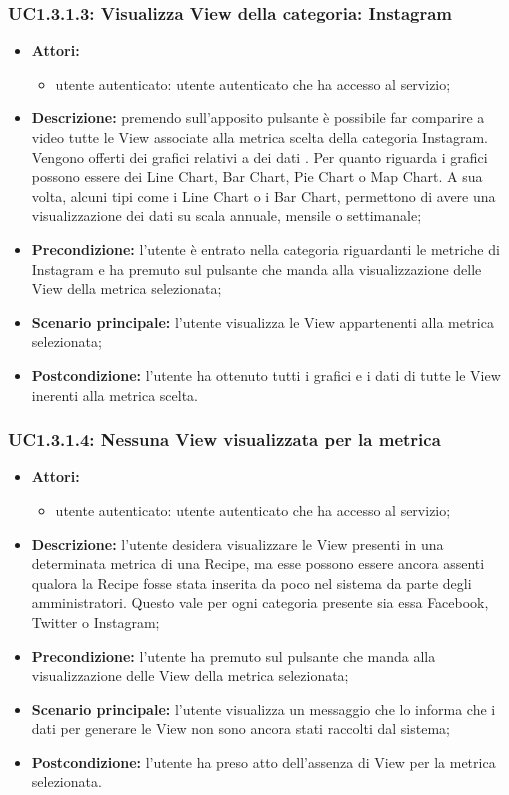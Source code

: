 \subsubsection{UC1.3.1.3: Visualizza View della categoria: Instagram}
\begin{itemize}
	\item \textbf{Attori:}
	\begin{itemize}
		\item utente autenticato: utente autenticato che ha accesso al servizio;
	\end{itemize}
	\item \textbf{Descrizione:} premendo sull'apposito pulsante è possibile far comparire a video tutte le View associate alla metrica scelta della categoria Instagram. Vengono offerti dei grafici relativi a dei dati
	. Per quanto riguarda i grafici possono essere dei Line Chart, Bar Chart, Pie Chart o Map Chart. A sua volta, alcuni tipi come i Line Chart o i Bar Chart, permettono di avere una visualizzazione dei dati su scala annuale, mensile o settimanale;
	\item \textbf{Precondizione:} l'utente è entrato nella categoria riguardanti le metriche di Instagram e ha premuto sul pulsante che manda alla visualizzazione delle View della metrica selezionata;
	\item \textbf{Scenario principale:} l'utente visualizza le View appartenenti alla metrica selezionata;
	\item \textbf{Postcondizione:} l'utente ha ottenuto tutti i grafici e i dati di tutte le View inerenti alla metrica scelta.
\end{itemize}

\subsubsection{UC1.3.1.4: Nessuna View visualizzata per la metrica}
\begin{itemize}
	\item \textbf{Attori:}
	\begin{itemize}
		\item utente autenticato: utente autenticato che ha accesso al servizio;
	\end{itemize}
	\item \textbf{Descrizione:} l'utente desidera visualizzare le View presenti in una determinata metrica di una Recipe, ma esse possono essere ancora assenti qualora la Recipe fosse stata inserita da poco nel sistema da parte degli amministratori. Questo vale per ogni categoria presente sia essa Facebook, Twitter o Instagram;
	\item \textbf{Precondizione:} l'utente ha premuto sul pulsante che manda alla visualizzazione delle View della metrica selezionata;
	\item \textbf{Scenario principale:} l'utente visualizza un messaggio che lo informa che i dati per generare le View non sono ancora stati raccolti dal sistema;
	\item \textbf{Postcondizione:} l'utente ha preso atto dell'assenza di View per la metrica selezionata.
\end{itemize}


